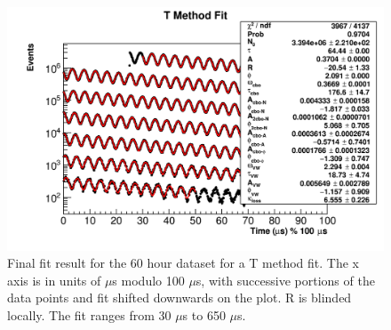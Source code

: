 	\begin{figure}[]
		\centering
		\includegraphics[width=\textwidth]{TMethod_moduloPlot}
	    \caption[TMethod_moduloPlot]{Final fit result for the 60 hour dataset for a T method fit. The x axis is in units of $\mu$s modulo 100 $\mu$s, with successive portions of the data points and fit shifted downwards on the plot. R is blinded locally. The fit ranges from 30 $\mu$s to 650 $\mu$s.}
	    \label{fig:TMethod_moduloPlot}
	\end{figure}

